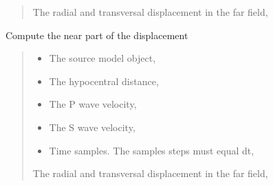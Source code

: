 \documentclass[letterpaper,10pt,english]{sphinxmanual}
\begin{document}
\begin{fulllineitems}
\begin{fulllineitems}
\begin{quote}
\begin{description}
\sphinxAtStartPar
The radial and transversal displacement in the far field,

\end{description}\end{quote}

\end{fulllineitems}


\begin{fulllineitems}
\label{\detokenize{api_lib:green_functions.BaseGreenFunction.near}}
\pysigstartsignatures
{}
\pysigstopsignatures
\sphinxAtStartPar
Compute the near part of the displacement
\begin{quote}\begin{description}
\begin{itemize}
\item {} 
\sphinxAtStartPar
{} \textendash{} The source model object,

\item {} 
\sphinxAtStartPar
{} \textendash{} The hypocentral distance,

\item {} 
\sphinxAtStartPar
{} \textendash{} The P wave velocity,

\item {} 
\sphinxAtStartPar
{} \textendash{} The S wave velocity,

\item {} 
\sphinxAtStartPar
{} \textendash{} Time samples. The samples steps must equal dt,

\end{itemize}

\sphinxAtStartPar
The radial and transversal displacement in the far field,

\end{description}\end{quote}

\end{fulllineitems}


\end{fulllineitems}
\end{document}
